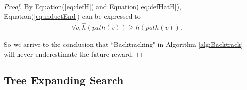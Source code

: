 \documentclass[12pt]{article}
\begin{document}
\begin{lem}
\begin{proof}
By Equation(\ref{eq:defH}) and Equation(\ref{eq:defHatH}), Equation(\ref{eq:inductEnd}) can be expressed to
\begin{equation}
\begin{aligned}
\forall v, \hat{h}(path(v)) \geq h(path(v)).
\end{aligned}
\end{equation}

So we arrive to the conclusion that ``Backtracking" in Algorithm \ref{alg:Backtrack} will never underestimate the future reward.




\end{proof}
\end{lem}



\subsection{Tree Expanding Search}
\end{document}

